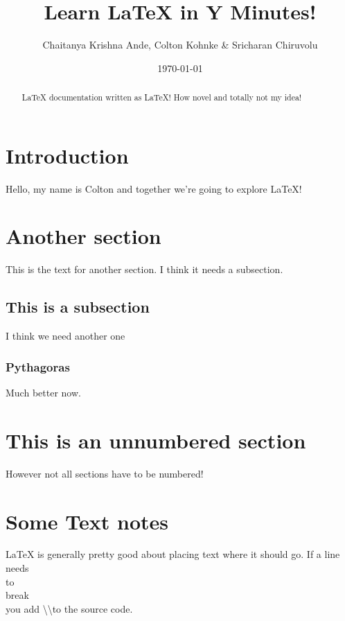 \documentclass[12pt]{article}
\author{Chaitanya Krishna Ande, Colton Kohnke \& Sricharan Chiruvolu}
\date{\today}
\title{Learn LaTeX in Y Minutes!}
\begin{document}
 
\maketitle

\begin{abstract}
 LaTeX documentation written as LaTeX! How novel and totally not my idea!
\end{abstract}

\section{Introduction}
Hello, my name is Colton and together we're going to explore LaTeX!

\section{Another section}
This is the text for another section. I think it needs a subsection.

\subsection{This is a subsection} %
I think we need another one

\subsubsection{Pythagoras}
Much better now.
\label{subsec:pythagoras}

\section*{This is an unnumbered section} 
However not all sections have to be numbered!

\section{Some Text notes}
LaTeX is generally pretty good about placing text where it should go. If 
a line \\ needs \\ to \\ break \\ you add \textbackslash\textbackslash to 
the source code. \\ 
\end{document}

